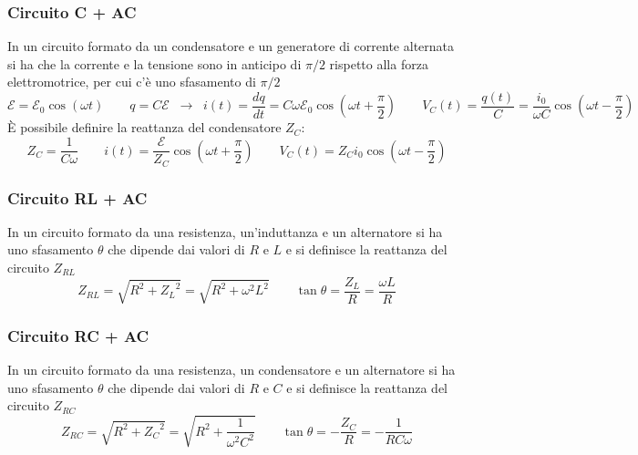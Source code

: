\documentclass[a4paper]{article}
\begin{document}
\subsubsection*{Circuito C + AC}
In un circuito formato da un condensatore e un generatore di corrente alternata si ha che la corrente e la tensione sono in
anticipo di \(\pi/2\) rispetto alla forza elettromotrice, per cui c'è uno sfasamento di \(\pi/2\)
\[\mathcal{E} = \mathcal{E}_0 \cos(\omega t) \qquad q = C \mathcal{E} \;\;\rightarrow\;\; i(t) = \frac{dq}{dt} = C \omega \mathcal{E}_0 \cos \left( \omega t + \frac{\pi}{2} \right) \qquad V_C(t) = \frac{q(t)}{C} = \frac{i_0}{\omega C} \cos \left( \omega t - \frac{\pi}{2} \right)\]
È possibile definire la reattanza del condensatore \(Z_C\):
\[Z_C = \frac{1}{C \omega} \qquad i(t) = \frac{\mathcal{E}}{Z_C} \cos \left( \omega t + \frac{\pi}{2} \right) \qquad V_C(t) = Z_C i_0 \cos \left( \omega t - \frac{\pi}{2} \right)\]

\subsubsection*{Circuito RL + AC}
In un circuito formato da una resistenza, un'induttanza e un alternatore si ha uno sfasamento \(\theta\) che dipende dai valori
di \(R\) e \(L\) e si definisce la reattanza del circuito \(Z_{RL}\)
\[Z_{RL} = \sqrt{R^2 + {Z_L}^2} = \sqrt{R^2 + \omega^2 L^2} \qquad \tan \theta = \frac{Z_L}{R} = \frac{\omega L}{R}\]

\subsubsection*{Circuito RC + AC}
In un circuito formato da una resistenza, un condensatore e un alternatore si ha uno sfasamento \(\theta\) che dipende dai valori
di \(R\) e \(C\) e si definisce la reattanza del circuito \(Z_{RC}\)
\[Z_{RC} = \sqrt{R^2 + {Z_C}^2} = \sqrt{R^2 + \frac{1}{\omega^2 C^2}} \qquad \tan \theta = -\frac{Z_C}{R} = -\frac{1}{RC\omega}\]
\end{document}
